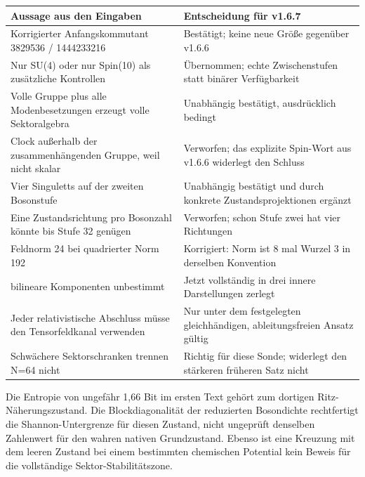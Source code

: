 {\def\LTcaptype{none} %
\begin{longtable}[]{@{}
  >{\raggedright\arraybackslash}p{}
  >{\raggedright\arraybackslash}p{}@{}}
\toprule\noalign{}
\begin{minipage}[b]{\linewidth}\raggedright
Aussage aus den Eingaben
\end{minipage} & \begin{minipage}[b]{\linewidth}\raggedright
Entscheidung für v1.6.7
\end{minipage} \\
\midrule\noalign{}
\endhead
\bottomrule\noalign{}
\endlastfoot
Korrigierter Anfangskommutant 3829536 / 1444233216 & Bestätigt; keine
neue Größe gegenüber v1.6.6 \\
Nur SU(4) oder nur Spin(10) als zusätzliche Kontrollen & Übernommen;
echte Zwischenstufen statt binärer Verfügbarkeit \\
Volle Gruppe plus alle Modenbesetzungen erzeugt volle Sektoralgebra &
Unabhängig bestätigt, ausdrücklich bedingt \\
Clock außerhalb der zusammenhängenden Gruppe, weil nicht skalar &
Verworfen; das explizite Spin-Wort aus v1.6.6 widerlegt den Schluss \\
Vier Singuletts auf der zweiten Bosonstufe & Unabhängig bestätigt und
durch konkrete Zustandsprojektionen ergänzt \\
Eine Zustandsrichtung pro Bosonzahl könnte bis Stufe 32 genügen &
Verworfen; schon Stufe zwei hat vier Richtungen \\
Feldnorm 24 bei quadrierter Norm 192 & Korrigiert: Norm ist 8 mal Wurzel
3 in derselben Konvention \\
4035 bilineare Komponenten unbestimmt & Jetzt vollständig in drei innere
Darstellungen zerlegt \\
Jeder relativistische Abschluss müsse den Tensorfeldkanal verwenden &
Nur unter dem festgelegten gleichhändigen, ableitungsfreien Ansatz
gültig \\
Schwächere Sektorschranken trennen N=64 nicht & Richtig für diese Sonde;
widerlegt den stärkeren früheren Satz nicht \\
\end{longtable}
}

Die Entropie von ungefähr 1,66 Bit im ersten Text gehört zum dortigen
Ritz-Nähe\-rungs\-zustand. Die Blockdiagonalität der reduzierten Bosondichte
rechtfertigt die Shannon-Untergrenze für diesen Zustand, nicht ungeprüft
denselben Zahlenwert für den wahren nativen Grundzustand. Ebenso ist
eine Kreuzung mit dem leeren Zustand bei einem bestimmten chemischen
Potential kein Beweis für die vollständige Sektor-Stabilitätszone.

